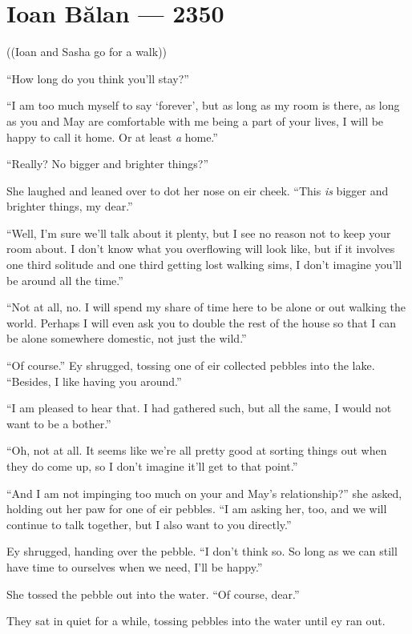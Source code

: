 \hypertarget{ioan-bux103lan-2350}{%
\chapter{Ioan Bălan — 2350}\label{ioan-bux103lan-2350}}

((Ioan and Sasha go for a walk))

``How long do you think you'll stay?''

``I am too much myself to say `forever', but as long as my room is there, as long as you and May are comfortable with me being a part of your lives, I will be happy to call it home. Or at least \emph{a} home.''

``Really? No bigger and brighter things?''

She laughed and leaned over to dot her nose on eir cheek. ``This \emph{is} bigger and brighter things, my dear.''

``Well, I'm sure we'll talk about it plenty, but I see no reason not to keep your room about. I don't know what you overflowing will look like, but if it involves one third solitude and one third getting lost walking sims, I don't imagine you'll be around all the time.''

``Not at all, no. I will spend my share of time here to be alone or out walking the world. Perhaps I will even ask you to double the rest of the house so that I can be alone somewhere domestic, not just the wild.''

``Of course.'' Ey shrugged, tossing one of eir collected pebbles into the lake. ``Besides, I like having you around.''

``I am pleased to hear that. I had gathered such, but all the same, I would not want to be a bother.''

``Oh, not at all. It seems like we're all pretty good at sorting things out when they do come up, so I don't imagine it'll get to that point.''

``And I am not impinging too much on your and May's relationship?'' she asked, holding out her paw for one of eir pebbles. ``I am asking her, too, and we will continue to talk together, but I also want to you directly.''

Ey shrugged, handing over the pebble. ``I don't think so. So long as we can still have time to ourselves when we need, I'll be happy.''

She tossed the pebble out into the water. ``Of course, dear.''

They sat in quiet for a while, tossing pebbles into the water until ey ran out.

